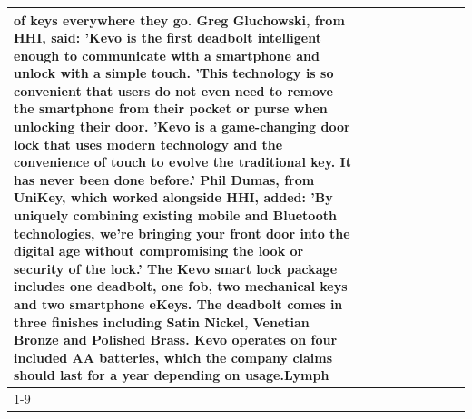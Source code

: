 \begin{table}[H]
\begin{tabular}{lllrlllll}
of keys everywhere they go. Greg Gluchowski, from HHI, said: 'Kevo is the first deadbolt intelligent enough to communicate with a smartphone and unlock with a simple touch. 'This technology is so convenient that users do not even need to remove the smartphone from their pocket or purse when unlocking their door. 'Kevo is a game-changing door lock that uses modern technology and the convenience of touch to evolve the traditional key. It has never been done before.' Phil Dumas, from UniKey, which worked alongside HHI, added: 'By uniquely combining existing mobile and Bluetooth technologies, we’re bringing your front door into the digital age without compromising the look or security of the lock.' The Kevo smart lock package includes one deadbolt, one fob, two mechanical keys and two smartphone eKeys. The deadbolt comes in three finishes including Satin Nickel, Venetian Bronze and Polished Brass. Kevo operates on four included AA batteries, which the company claims should last for a year depending on usage.Lymph \\
\cline{1-9}

\end{tabular}
\end{table}

